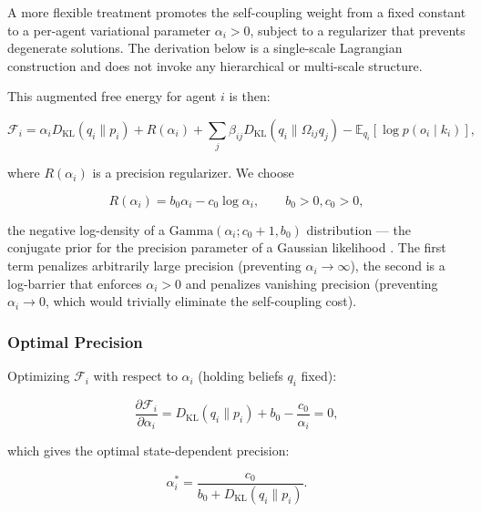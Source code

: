 \documentclass[twoside,11pt]{article}
\begin{document}
A more flexible treatment promotes the self-coupling weight from a fixed constant to a per-agent variational parameter $\alpha_i > 0$, subject to a regularizer that prevents degenerate solutions. The derivation below is a single-scale Lagrangian construction and does not invoke any hierarchical or multi-scale structure.

This augmented free energy for agent $i$ is then:

\begin{equation}
\mathcal{F}_i = \alpha_i D_{\mathrm{KL}}(q_i \| p_i)
+ R(\alpha_i)
+ \sum_j \beta_{ij} D_{\mathrm{KL}}(q_i \| \Omega_{ij} q_j)
- \mathbb{E}_{q_i}[\log p(o_i \mid k_i)],
\label{eq:free_energy_adaptive}
\end{equation}

where $R(\alpha_i)$ is a precision regularizer. We choose

\begin{equation}
R(\alpha_i) = b_0 \alpha_i - c_0 \log \alpha_i, \qquad b_0 > 0, c_0 > 0,
\label{eq:precision_regularizer}
\end{equation}

the negative log-density of a $\mathrm{Gamma}(\alpha_i; c_0 + 1, b_0)$ distribution — the conjugate prior for the precision parameter of a Gaussian likelihood \citep{bishop2006pattern, murphy2012machine}. The first term penalizes arbitrarily large precision (preventing $\alpha_i \to \infty$), the second is a log-barrier that enforces $\alpha_i > 0$ and penalizes vanishing precision (preventing $\alpha_i \to 0$, which would trivially eliminate the self-coupling cost). 

\subsubsection{Optimal Precision}

Optimizing $\mathcal{F}_i$ with respect to $\alpha_i$ (holding beliefs $q_i$ fixed):

\begin{equation}
\frac{\partial \mathcal{F}_i}{\partial \alpha_i}
= D_{\mathrm{KL}}(q_i \| p_i) + b_0 - \frac{c_0}{\alpha_i} = 0,
\end{equation}

which gives the optimal state-dependent precision:

\begin{equation}
\boxed{
\alpha_i^*
 = \frac{c_0}{b_0 + D_{\mathrm{KL}}(q_i \| p_i)}.
}
\label{eq:state_dependent_alpha}
\end{equation}
\end{document}
